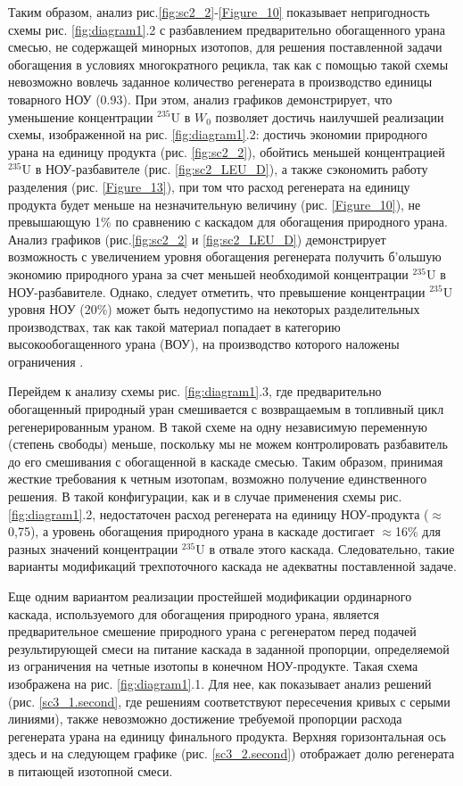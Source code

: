 Таким образом, анализ рис.\ref{fig:sc2_2}-\ref{Figure_10} показывает непригодность схемы рис. \ref{fig:diagram1}.2 с разбавлением предварительно обогащенного урана смесью, не содержащей минорных изотопов, для решения поставленной задачи обогащения в условиях многократного рецикла, так как с помощью такой схемы невозможно вовлечь заданное количество регенерата в производство единицы товарного НОУ (0.93). При этом, анализ графиков демонстрирует, что уменьшение концентрации $^{235}$U в $W_0$ позволяет достичь наилучшей реализации схемы, изображенной на рис. \ref{fig:diagram1}.2: достичь экономии природного урана на единицу продукта (рис. \ref{fig:sc2_2}), обойтись меньшей концентрацией $^{235}$U в НОУ-разбавителе (рис. \ref{fig:sc2_LEU_D}), а также сэкономить работу разделения (рис. \ref{Figure_13}), при том что расход регенерата на единицу продукта будет меньше на незначительную величину (рис. \ref{Figure_10}), не превышающую 1\% по сравнению с каскадом для обогащения природного урана. Анализ графиков (рис.\ref{fig:sc2_2} и \ref{fig:sc2_LEU_D}) демонстрирует возможность с увеличением уровня обогащения регенерата получить б'ольшую экономию природного урана за счет меньшей необходимой концентрации $^{235}$U в НОУ-разбавителе. Однако, следует отметить, что превышение концентрации $^{235}$U уровня НОУ (20\%) может быть недопустимо на некоторых разделительных производствах, так как такой материал попадает в категорию высокообогащенного урана (ВОУ), на производство которого наложены ограничения \cite{gusevProliferationResistanceAnalysis2019}.


Перейдем к анализу схемы рис. \ref{fig:diagram1}.3, где предварительно обогащенный природный уран смешивается с возвращаемым в топливный цикл регенерированным ураном. В такой схеме на одну независимую переменную (степень свободы) меньше, поскольку мы не можем контролировать разбавитель до его смешивания с обогащенной в каскаде смесью. Таким образом, принимая жесткие требования к четным изотопам, возможно получение единственного решения. В такой конфигурации, как и в случае применения схемы рис. \ref{fig:diagram1}.2, недостаточен расход регенерата на единицу НОУ-продукта ($\approx$0,75), а уровень обогащения природного урана в каскаде достигает $\approx$16\% для разных значений концентрации $^{235}$U в отвале этого каскада. Следовательно, такие варианты модификаций трехпоточного каскада не адекватны поставленной задаче.

Еще одним вариантом реализации простейшей модификации ординарного каскада, используемого для обогащения природного урана, является предварительное смешение природного урана с регенератом перед подачей результирующей смеси на питание каскада в заданной пропорции, определяемой из ограничения на четные изотопы в конечном НОУ-продукте. Такая схема изображена на рис. \ref{fig:diagram1}.1. Для нее, как показывает анализ решений (рис. \ref{sc3_1.second}, где решениям соответствуют пересечения кривых с серыми линиями), также невозможно достижение требуемой пропорции расхода регенерата урана на единицу финального продукта. Верхняя горизонтальная ось здесь и на следующем графике (рис. \ref{sc3_2.second}) отображает долю регенерата в питающей изотопной смеси.

